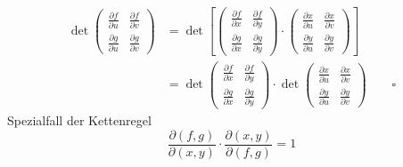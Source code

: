 \begin{equation}
\begin{split}
   \det
  \begin{pmatrix}
    \frac{\partial f}{\partial u} & \frac{\partial f}{\partial v} \\
    \frac{\partial g}{\partial u} & \frac{\partial g}{\partial v}
  \end{pmatrix}
  &= \det \left[
  \begin{pmatrix}
    \frac{\partial f}{\partial x} & \frac{\partial f}{\partial y} \\
    \frac{\partial g}{\partial x} & \frac{\partial g}{\partial y}
  \end{pmatrix}
  \cdot
  \begin{pmatrix}
    \frac{\partial x}{\partial u} & \frac{\partial x}{\partial v} \\
    \frac{\partial y}{\partial u} & \frac{\partial y}{\partial v}
  \end{pmatrix}
  \right] \\
  &= \det 
    \begin{pmatrix}
    \frac{\partial f}{\partial x} & \frac{\partial f}{\partial y} \\
    \frac{\partial g}{\partial x} & \frac{\partial g}{\partial y}
  \end{pmatrix}
  \cdot \det
  \begin{pmatrix}
    \frac{\partial x}{\partial u} & \frac{\partial x}{\partial v} \\
    \frac{\partial y}{\partial u} & \frac{\partial y}{\partial v}
  \end{pmatrix} \qquad \square
\end{split}
\end{equation}
Spezialfall der Kettenregel 
\begin{equation}
  \frac{\partial(f, g)}{\partial(x, y)} \cdot \frac{\partial(x, y)}{\partial(f, g)} = 1
\end{equation}
